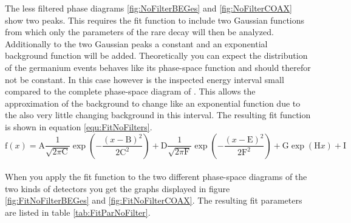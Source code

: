 The less filtered phase diagrams \ref{fig:NoFilterBEGes} and \ref{fig:NoFilterCOAX} show two peaks.
This requires the fit function to include two Gaussian functions from which only the parameters of the rare  decay will then be analyzed.
Additionally to the two Gaussian peaks a constant and an exponential background function will be added.
Theoretically you can expect the distribution of the germanium events behaves like its phase-space function and should therefor not be constant.
In this case however is the inspected energy interval small compared to the complete phase-space diagram of .
This allows the approximation of the background to change like an exponential function due to the also very little changing background in this interval.
The resulting fit function is shown in equation \ref{equ:FitNoFilters}.
\\

\begin{equation}
\mathrm{f}(x) = \mathrm{A}\frac{1}{\sqrt{2\pi\mathrm{C}}}\exp\left(-\frac{(x-\mathrm{B})^2}{2\mathrm{C}^2}\right) + \mathrm{D}\frac{1}{\sqrt{2\pi\mathrm{F}}}\exp\left(-\frac{(x-\mathrm{E})^2}{2\mathrm{F}^2}\right) + \mathrm{G}\exp\left(\mathrm{H}x\right) + \mathrm{I}
\label{equ:FitNoFilters}
\end{equation}
\\

When you apply the fit function to the two different phase-space diagrams of the two kinds of detectors you get the graphs displayed in figure \ref{fig:FitNoFilterBEGes} and \ref{fig:FitNoFilterCOAX}.
The resulting fit parameters are listed in table \ref{tab:FitParNoFilter}. 
\\


